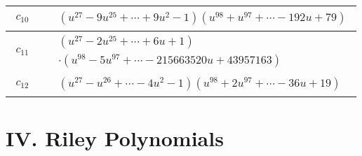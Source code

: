 \documentclass[1p]{elsarticle_modified}
\theoremstyle{definition}
\begin{document}
\begin{tabular}{m{50pt}|m{274pt}}
\hline $$\begin{aligned}c_{10}\end{aligned}$$&$\begin{aligned}
&(u^{27}-9 u^{25}+\cdots+9 u^2-1)(u^{98}+u^{97}+\cdots-192 u+79)
\end{aligned}$\\
\hline $$\begin{aligned}c_{11}\end{aligned}$$&$\begin{aligned}
&(u^{27}-2 u^{25}+\cdots+6 u+1)\\
&\cdot(u^{98}-5 u^{97}+\cdots-215663520 u+43957163)
\end{aligned}$\\
\hline $$\begin{aligned}c_{12}\end{aligned}$$&$\begin{aligned}
&(u^{27}- u^{26}+\cdots-4 u^2-1)(u^{98}+2 u^{97}+\cdots-36 u+19)
\end{aligned}$\\
\hline
\end{tabular}\newpage\renewcommand{\arraystretch}{1}
\centering \section*{ IV. Riley Polynomials}
\end{document}
